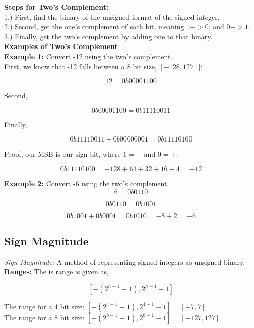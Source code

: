\documentclass{article}
\begin{document}
\noindent \textbf{Steps for Two's Complement:} \\

1.) First, find the binary of the unsigned format of the signed integer. \\

2.) Second, get the one's complement of each bit, meaning $1 -> 0$, and $0 -> 1$. \\

3.) Finally, get the two's complement by adding one to that binary. \\

\noindent \textbf{Examples of Two's Complement} \\

\noindent \textbf{Example 1:} Convert -12 using the two's complement. \\

First, we know that -12 falls between a 8 bit size, $[-128, 127]]$:

\[
12 = 0b0000 1100
\] 

Second,

\[
0b0000 1100 = 0b1111 0011
\]

Finally,

\[
0b1111 0011 + 0b0000 0001 = 0b1111 0100
\]

Proof, our MSB is our sign bit, where $1 = -$ and $0 = +$.

\[
0b1111 0100 = -128 + 64 + 32 + 16 + 4 = -12
\]

\noindent \textbf{Example 2:} Convert -6 using the two's complement. \\

\[
6 = 0b0110
\]

\[
0b0110 = 0b1001
\]

\[
0b1001 + 0b0001 = 0b1010 = -8 + 2 = -6
\]

\subsection*{Sign Magnitude}
\textit{Sign Magnitude:} A method of representing signed integers as unsigned binary. \\

\noindent \textbf{Ranges:} The is range is given as, 

\[
[-(2^{n-1} - 1), 2^{n-1} - 1]
\]

\noindent The range for a 4 bit size: $[-(2^{4-1} - 1), 2^{4-1} - 1] = [-7, 7]$ \\

\noindent The range for a 8 bit size: $[-(2^{8-1} - 1), 2^{8-1} - 1] = [-127, 127]$ \\
\end{document}
